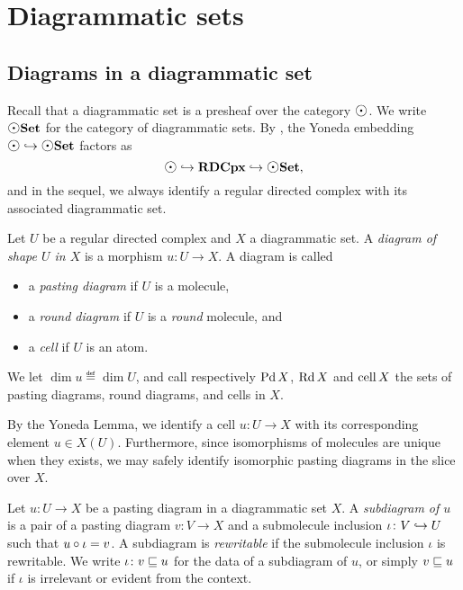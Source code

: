 \section{Diagrammatic sets}

\subsection{Diagrams in a diagrammatic set}

Recall that a diagrammatic set is a presheaf over the category \( \atom \).
We write \( \dgmSet \) for the category of diagrammatic sets.
By \cite[Lemma 2.5]{chanavat2024htpy}, the Yoneda embedding \( \atom \incl \dgmSet \) factors as
\begin{equation*}
    \atom \incl \rdcpx \incl \dgmSet,
\end{equation*} 
and in the sequel, we always identify a regular directed complex with its associated diagrammatic set.

\begin{dfn} 
    Let \( U \) be a regular directed complex and \( X \) a diagrammatic set.
    A \emph{diagram of shape \( U \) in \( X \)} is a morphism \( u \colon U \to X \).
    A diagram is called
    \begin{itemize}
        \item a \emph{pasting diagram} if \( U \) is a molecule,
        \item a \emph{round diagram} if \( U \) is a \emph{round} molecule, and
        \item a \emph{cell} if \( U \) is an atom.
    \end{itemize}
    We let \( \dim u \eqdef \dim U \), and call respectively \( \operatorname{Pd} X \), \( \operatorname{Rd} X \) and \( \operatorname{cell} X \) the sets of pasting diagrams, round diagrams, and cells in \( X \).
\end{dfn}

\begin{rmk}
    By the Yoneda Lemma, we identify a cell \( u \colon U \to X \) with its corresponding element \( u \in X(U) \).
    Furthermore, since isomorphisms of molecules are unique when they exists, we may safely identify isomorphic pasting diagrams in the slice over \( X \).
\end{rmk}

\begin{dfn} [Subdiagram]
    Let \( u \colon U \to X \) be a pasting diagram in a diagrammatic set \( X \).
    A \emph{subdiagram of \( u \)} is a pair of a pasting diagram \( v \colon V \to X \) and a submolecule inclusion \( \iota \colon V \hookrightarrow U \) such that \( u \circ \iota = v \).
    A subdiagram is \emph{rewritable} if the submolecule inclusion \( \iota \) is rewritable.
    We write \( \iota \colon v \sqsubseteq u \) for the data of a subdiagram of \( u \), or simply \( v \sqsubseteq u \) if \( \iota \) is irrelevant or evident from the context. 
\end{dfn}

